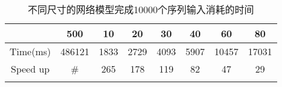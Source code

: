 \begin{center}
\begin{table}
	\caption{不同尺寸的网络模型完成10000个序列输入消耗的时间}
	\renewcommand\arraystretch{1.2}
	\setlength{\tabcolsep}{10pt}
	\begin{tabular}{cccccccc}
	\toprule
		 		&		500		&	10		&	20		&	30		&	40		&	60		&	80		\\	\midrule
	Time(ms)	&		486121	&	1833	&	2729	&	4093	&	5907	&	10457	&	17031 \\	\hline
	Speed up	&		\#		&	265		&	178		&	119		&	82		&	47		&	29 \\
	\bottomrule
	\label{tab:time}
	\end{tabular}
\end{table}
\vspace{-3em}
\end{center}

